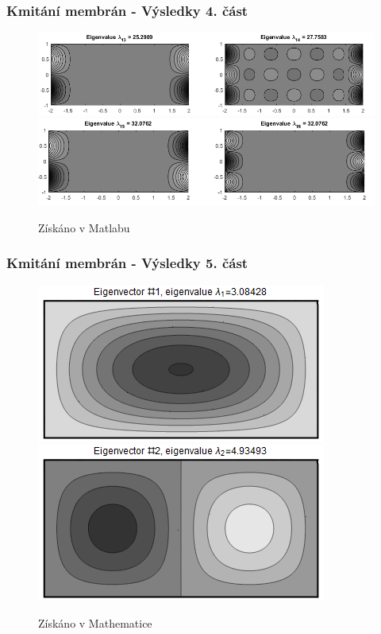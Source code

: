 \documentclass{beamer}
\begin{document}
\begin{frame}
\frametitle{Kmitání membrán - Výsledky 4. část}
\centering
\begin{figure}
\includegraphics[width=1\linewidth]{obdelnicky7.png}
\includegraphics[width=1\linewidth]{obdelnicky8.png}
\caption{Získáno v Matlabu}
\end{figure}
\end{frame}

\begin{frame}
\frametitle{Kmitání membrán - Výsledky 5. část}
\centering
\begin{figure}
\includegraphics[width=.6\linewidth]{rectangle-eigenvector-1.png}
\includegraphics[width=.6\linewidth]{rectangle-eigenvector-2.png}
\caption{Získáno v Mathematice}
\end{figure}
\end{frame}
\end{document}
